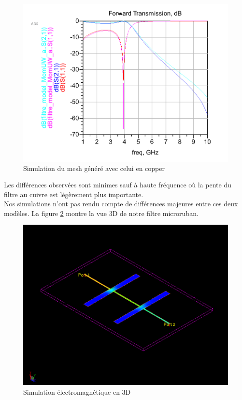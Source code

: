 \documentclass[a4paper]{article}
\begin{document}
\begin{figure}[!htb]
\begin{center}
  \includegraphics[scale=0.35]{mesh_copper.png}
  \caption{Simulation du mesh g\'en\'er\'e avec celui en copper}
  \label{sim_momentum_copper}
\end{center}
\end{figure}

Les diff\'erences observ\'ees sont minimes sauf \`a haute fr\'equence o\`u la pente du filtre au cuivre est l\'eg\`erement plus importante.\\
Nos simulations n'ont pas rendu compte de diff\'erences majeures entre ces deux mod\`eles. La figure \ref{sim_3D} montre la vue 3D de
notre filtre microruban.

\begin{figure}[!htb]
\begin{center}
  \includegraphics[scale=0.30]{3D_electromag_sim.png}
  \caption{Simulation \'electromagn\'etique en 3D}
  \label{sim_3D}
\end{center}
\end{figure}
\end{document}
